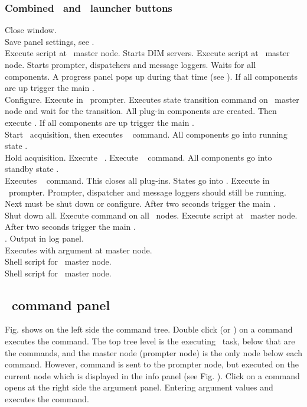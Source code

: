 {\subsubsection{Combined \dabc\ and \mbs\ launcher buttons}
 Close window.\\
 Save panel settings, see .\\
  Execute script  at \dabc\ master node.
Starts DIM servers.
Execute script  at \mbs\ master node.
Starts prompter, dispatchers and message loggers.
Waits for all components.
A progress panel pops up during that time
(see ).
If all components are up trigger the main .\\
 Configure. Execute  in \mbs\ prompter.
Executes state transition command 
on \dabc\ master node and wait for the transition.
All plug-in components are created. Then execute .
If all components are up trigger the main .\\
 Start \mbs\ acquisition, then executes \dabc\  command.
All components go into running state .\\
 Hold acquisition. Execute \mbs\ .
Execute \dabc\  command.
All components go into standby state .\\
 Executes \dabc\  command.
This closes all plug-ins. States go into . 
Execute  in \mbs\ prompter.
Prompter, dispatcher and message loggers should still be running.
Next must be shut down or configure.
After two seconds trigger the main .\\
 Shut down all. Execute  command on all \dabc\ nodes.
Execute script  at \mbs\ master node.
After two seconds trigger the main .\\
 . Output in log panel.\\
 Executes  with argument  at master node.\\
 Shell script for \mbs\ master node.\\
 Shell script for \dabc\ master node.
\subsection{\mbs\ command panel}
Fig.  shows
on the left side the command tree. Double click (or ) on a command
executes the command. The top tree level is the executing \mbs\ task,
below that are the commands, and the master node (prompter node) is the only node
below each command. However,
command is sent to the prompter node, but executed on the current node 
which is displayed in the info panel
(see Fig. ).
Click on a command opens at the right side the argument panel.
Entering argument values and  executes the command.
}
